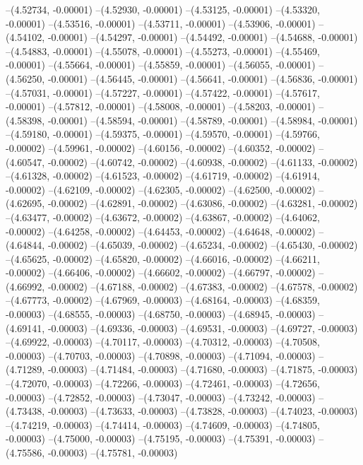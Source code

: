 --(4.52734, -0.00001)
--(4.52930, -0.00001)
--(4.53125, -0.00001)
--(4.53320, -0.00001)
--(4.53516, -0.00001)
--(4.53711, -0.00001)
--(4.53906, -0.00001)
--(4.54102, -0.00001)
--(4.54297, -0.00001)
--(4.54492, -0.00001)
--(4.54688, -0.00001)
--(4.54883, -0.00001)
--(4.55078, -0.00001)
--(4.55273, -0.00001)
--(4.55469, -0.00001)
--(4.55664, -0.00001)
--(4.55859, -0.00001)
--(4.56055, -0.00001)
--(4.56250, -0.00001)
--(4.56445, -0.00001)
--(4.56641, -0.00001)
--(4.56836, -0.00001)
--(4.57031, -0.00001)
--(4.57227, -0.00001)
--(4.57422, -0.00001)
--(4.57617, -0.00001)
--(4.57812, -0.00001)
--(4.58008, -0.00001)
--(4.58203, -0.00001)
--(4.58398, -0.00001)
--(4.58594, -0.00001)
--(4.58789, -0.00001)
--(4.58984, -0.00001)
--(4.59180, -0.00001)
--(4.59375, -0.00001)
--(4.59570, -0.00001)
--(4.59766, -0.00002)
--(4.59961, -0.00002)
--(4.60156, -0.00002)
--(4.60352, -0.00002)
--(4.60547, -0.00002)
--(4.60742, -0.00002)
--(4.60938, -0.00002)
--(4.61133, -0.00002)
--(4.61328, -0.00002)
--(4.61523, -0.00002)
--(4.61719, -0.00002)
--(4.61914, -0.00002)
--(4.62109, -0.00002)
--(4.62305, -0.00002)
--(4.62500, -0.00002)
--(4.62695, -0.00002)
--(4.62891, -0.00002)
--(4.63086, -0.00002)
--(4.63281, -0.00002)
--(4.63477, -0.00002)
--(4.63672, -0.00002)
--(4.63867, -0.00002)
--(4.64062, -0.00002)
--(4.64258, -0.00002)
--(4.64453, -0.00002)
--(4.64648, -0.00002)
--(4.64844, -0.00002)
--(4.65039, -0.00002)
--(4.65234, -0.00002)
--(4.65430, -0.00002)
--(4.65625, -0.00002)
--(4.65820, -0.00002)
--(4.66016, -0.00002)
--(4.66211, -0.00002)
--(4.66406, -0.00002)
--(4.66602, -0.00002)
--(4.66797, -0.00002)
--(4.66992, -0.00002)
--(4.67188, -0.00002)
--(4.67383, -0.00002)
--(4.67578, -0.00002)
--(4.67773, -0.00002)
--(4.67969, -0.00003)
--(4.68164, -0.00003)
--(4.68359, -0.00003)
--(4.68555, -0.00003)
--(4.68750, -0.00003)
--(4.68945, -0.00003)
--(4.69141, -0.00003)
--(4.69336, -0.00003)
--(4.69531, -0.00003)
--(4.69727, -0.00003)
--(4.69922, -0.00003)
--(4.70117, -0.00003)
--(4.70312, -0.00003)
--(4.70508, -0.00003)
--(4.70703, -0.00003)
--(4.70898, -0.00003)
--(4.71094, -0.00003)
--(4.71289, -0.00003)
--(4.71484, -0.00003)
--(4.71680, -0.00003)
--(4.71875, -0.00003)
--(4.72070, -0.00003)
--(4.72266, -0.00003)
--(4.72461, -0.00003)
--(4.72656, -0.00003)
--(4.72852, -0.00003)
--(4.73047, -0.00003)
--(4.73242, -0.00003)
--(4.73438, -0.00003)
--(4.73633, -0.00003)
--(4.73828, -0.00003)
--(4.74023, -0.00003)
--(4.74219, -0.00003)
--(4.74414, -0.00003)
--(4.74609, -0.00003)
--(4.74805, -0.00003)
--(4.75000, -0.00003)
--(4.75195, -0.00003)
--(4.75391, -0.00003)
--(4.75586, -0.00003)
--(4.75781, -0.00003)
